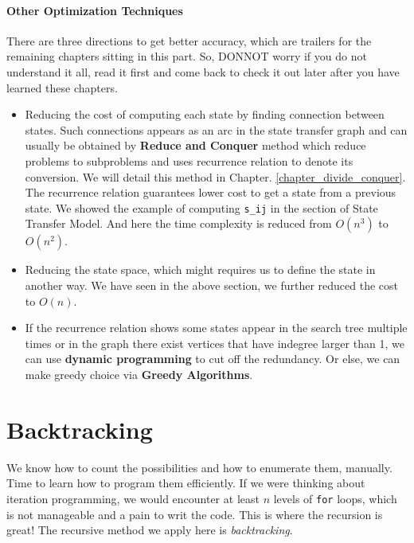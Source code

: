 \documentclass[../main.tex]{subfiles}
\begin{document}
\paragraph{Other Optimization Techniques}
There are three directions to get better accuracy, which are trailers for the remaining chapters sitting in this part. So, DONNOT worry if you do not understand it all, read it first and come back to check it out later after you have learned these chapters. 
\begin{itemize}
\item Reducing the cost of computing each state by finding connection between states. Such connections appears as an arc in the state transfer graph and can usually be obtained by \textbf{Reduce and Conquer} method which reduce problems to subproblems and uses recurrence relation to denote its conversion. We will detail this method in Chapter. \ref{chapter_divide_conquer}. The recurrence relation guarantees lower cost to get a state from a previous state. We showed the example of computing \texttt{s\_{ij}} in the section of State Transfer Model. And here the time complexity is reduced from $O(n^3)$ to $O(n^2)$.
\item Reducing the state space, which might requires us to define the state in another way.  We have seen in the above section, we further reduced the cost to $O(n)$.
\item If the recurrence relation shows some states  appear in the search tree multiple times or in the graph there exist vertices that have indegree larger than 1, we can use \textbf{dynamic programming} to cut off the redundancy. Or else, we can make greedy choice via \textbf{Greedy Algorithms}.
\end{itemize}




\section{Backtracking}

We know how to count the possibilities and how to enumerate them, manually. Time to learn how to program them efficiently. If we were thinking about iteration programming, we would encounter at least $n$ levels of \texttt{for} loops, which is not manageable and a pain to writ the code. This is where the recursion is great! The recursive method we apply here is  \textit{backtracking}. 
\end{document}
